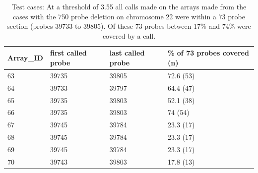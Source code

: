 \begin{table}[h]
\centering
\caption[Test cases: The calls made on the arrays made from the cases with the 750 probe deletion on chromosome 22]{Test cases: At a threshold of 3.55 all calls made on the arrays made from the cases with the 750 probe deletion on chromosome 22 were within a 73 probe section (probes 39733 to 39805). Of these 73 probes between 17\% and 74\% were covered by a call.}
\label{tab:chr22delcalls}
\begin{tabular}{@{}llll@{}}
\toprule
Array\_ID & first called probe & last called probe & \% of 73 probes covered (n) \\ \midrule
63        & 39735              & 39805             & 72.6 (53)                   \\
64        & 39733              & 39797             & 64.4 (47)                   \\
65        & 39735              & 39803             & 52.1 (38)                   \\
66        & 39735              & 39803             & 74 (54)                     \\
67        & 39745              & 39784             & 23.3 (17)                   \\
68        & 39745              & 39784             & 23.3 (17)                   \\
69        & 39745              & 39784             & 23.3 (17)                   \\
70        & 39743              & 39803             & 17.8 (13)                   \\ \bottomrule
\end{tabular}
\end{table}